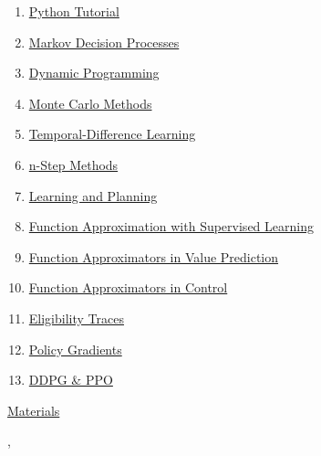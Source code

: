 \documentclass[11pt]{article}
\renewcommand{\today}{\shortmonthname[\the\month] \the \day,  \the\year}
\begin{document}
\vspace{-1cm}

\begin{enumerate}
	\item  \href{https://mp.weixin.qq.com/s/xMOtJyXxqcM88O-Hmsqatw}{Python Tutorial} %
	\item  \href{https://mp.weixin.qq.com/s/ty-z6ZEWpPNsnv_-AwYa3A}{Markov Decision Processes} %
	\item  \href{https://mp.weixin.qq.com/s/1a5NRG9rnFMEVzhf0-SqVw}{Dynamic Programming} %
	\item  \href{https://mp.weixin.qq.com/s/CRti-ca2b-YfIixfLW5s3A}{Monte Carlo Methods} %
	\item  \href{https://mp.weixin.qq.com/s/2Z_bHYL5v1CffKDYGikY5w}{Temporal-Difference Learning} %
	\item  \href{https://mp.weixin.qq.com/s/Y0Ua4KnNzVMRBu4qQ3eVnA}{n-Step Methods} %
	\item  \href{https://mp.weixin.qq.com/s/VTi4p-zC-flgR4E2sIhtvA}{Learning and Planning} %
	\item  \href{https://mp.weixin.qq.com/s/G2HXePIKoS0KBIjEMkhRbg}{Function Approximation with Supervised Learning} %
	\item  \href{https://mp.weixin.qq.com/s/bZ0QjlVKmMlNowGZt5SIVg}{Function Approximators in Value Prediction} %
	\item  \href{https://mp.weixin.qq.com/s/NKVcpsa9F_RGz1EqRgb6TQ}{Function Approximators in Control} %
	\item  \href{https://mp.weixin.qq.com/s/PlG2_3ewLE_j2PdKBMfI7w}{Eligibility Traces} %
	\item  \href{https://mp.weixin.qq.com/s/h0N35C0z1Rj7vrtVWN5DEg}{Policy Gradients} %
	\item  \href{https://mp.weixin.qq.com/s/Cn69hOhE8A5O7wnB2UQeIw}{DDPG \& PPO} %
\end{enumerate}

\vspace{-1cm}

\begin{center}
	\large \href{https://pan.baidu.com/s/1DBpq8f4bd4Awe1ShkL8vnA?pwd=1121}{Materials}
\end{center}


%
\begin{flushright}
	\tiny \today 
\end{flushright}
\end{document}
